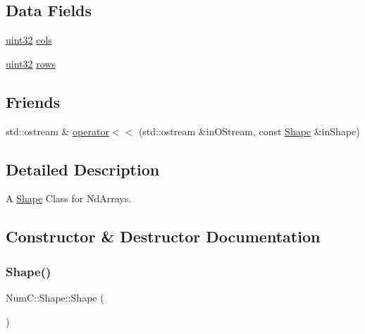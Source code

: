 \subsection*{Data Fields}
\begin{DoxyCompactItemize}
\item 
\mbox{\hyperlink{namespace_num_c_ae685802ca6d3035f2b400b081e3953fa}{uint32}} \mbox{\hyperlink{class_num_c_1_1_shape_a21b0f7b0587aad86f050e7086ceea9e7}{cols}}
\item 
\mbox{\hyperlink{namespace_num_c_ae685802ca6d3035f2b400b081e3953fa}{uint32}} \mbox{\hyperlink{class_num_c_1_1_shape_a9535da39217424a1afb81c0a7baa3acc}{rows}}
\end{DoxyCompactItemize}
\subsection*{Friends}
\begin{DoxyCompactItemize}
\item 
std\+::ostream \& \mbox{\hyperlink{class_num_c_1_1_shape_a520d818f31bbdacdf8cfbe6de9e88a28}{operator$<$$<$}} (std\+::ostream \&in\+O\+Stream, const \mbox{\hyperlink{class_num_c_1_1_shape}{Shape}} \&in\+Shape)
\end{DoxyCompactItemize}


\subsection{Detailed Description}
A \mbox{\hyperlink{class_num_c_1_1_shape}{Shape}} Class for Nd\+Arrays. 

\subsection{Constructor \& Destructor Documentation}
\mbox{\label{class_num_c_1_1_shape_a33079d7437111c508cafe411e3fd033c}} 
\subsubsection{\texorpdfstring{Shape()}{Shape()}\hspace{0.1cm}{\footnotesize\ttfamily [1/3]}}
{\footnotesize\ttfamily Num\+C\+::\+Shape\+::\+Shape (\begin{DoxyParamCaption}{ }\end{DoxyParamCaption})\hspace{0.3cm}{\ttfamily [inline]}}

